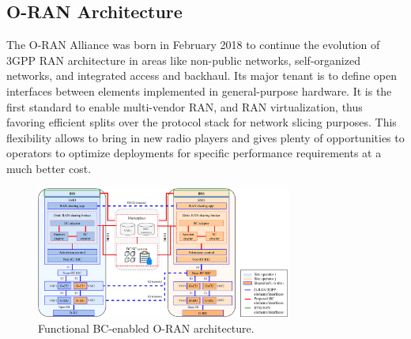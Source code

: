 \documentclass[journal]{IEEEtran}
\begin{document}
\subsection{O-RAN Architecture}
The O-RAN Alliance was born in February 2018 to continue the evolution of 3GPP RAN architecture in areas like non-public networks, self-organized networks, and integrated access and backhaul. Its major tenant is to define open interfaces between elements implemented in general-purpose hardware. It is the first standard to enable multi-vendor RAN, and RAN virtualization, thus favoring efficient splits over the protocol stack for network slicing purposes. This flexibility allows to bring in new radio players and gives plenty of opportunities to operators to optimize deployments for specific performance requirements at a much better cost. 

\begin{figure}[ht!]    
\centering
\includegraphics[width=0.75\textwidth]{functionalarchitecture2.pdf}
\caption{Functional BC-enabled O-RAN architecture.}
\label{fig:functionalarchitecture}
\end{figure}
\end{document}
